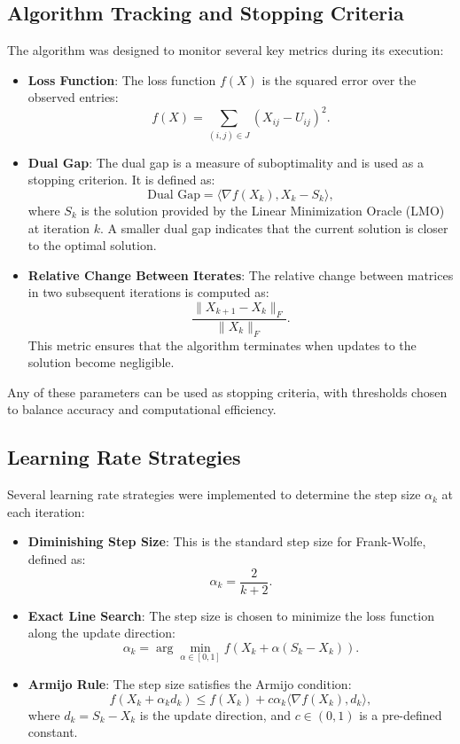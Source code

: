 \documentclass[a4paper, 11pt, reqno]{article} %
\begin{document}
\begin{multicols}{2}
\subsection{Algorithm Tracking and Stopping Criteria}
The algorithm was designed to monitor several key metrics during its execution:
\begin{itemize}
    \item \textbf{Loss Function}: The loss function \(f(X)\) is the squared error over the observed entries:
    \[
    f(X) = \sum_{(i,j) \in J} (X_{ij} - U_{ij})^2.
    \]
    \item \textbf{Dual Gap}: The dual gap is a measure of suboptimality and is used as a stopping criterion. It is defined as:
    \[
    \text{Dual Gap} = \langle \nabla f(X_k), X_k - S_k \rangle,
    \]
    where \(S_k\) is the solution provided by the Linear Minimization Oracle (LMO) at iteration \(k\). A smaller dual gap indicates that the current solution is closer to the optimal solution.
    \item \textbf{Relative Change Between Iterates}: The relative change between matrices in two subsequent iterations is computed as:
    \[
    \frac{\|X_{k+1} - X_k\|_F}{\|X_k\|_F}.
    \]
    This metric ensures that the algorithm terminates when updates to the solution become negligible.
\end{itemize}
Any of these parameters can be used as stopping criteria, with thresholds chosen to balance accuracy and computational efficiency.

\subsection{Learning Rate Strategies}
Several learning rate strategies were implemented to determine the step size \(\alpha_k\) at each iteration:
\begin{itemize}
    \item \textbf{Diminishing Step Size}: This is the standard step size for Frank-Wolfe, defined as:
    \[
    \alpha_k = \frac{2}{k + 2}.
    \]
    \item \textbf{Exact Line Search}: The step size is chosen to minimize the loss function along the update direction:
    \[
    \alpha_k = \arg\min_{\alpha \in [0, 1]} f(X_k + \alpha (S_k - X_k)).
    \]
    \item \textbf{Armijo Rule}: The step size satisfies the Armijo condition:
    \[
    f(X_k + \alpha_k d_k) \leq f(X_k) + c \alpha_k \langle \nabla f(X_k), d_k \rangle,
    \]
    where \(d_k = S_k - X_k\) is the update direction, and \(c \in (0, 1)\) is a pre-defined constant.
\end{itemize}


\end{multicols}
\end{document}
